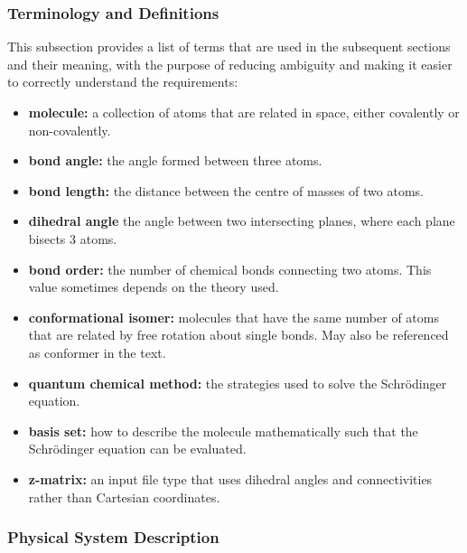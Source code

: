 \documentclass[12pt]{article}
\begin{document}
\subsubsection{Terminology and Definitions}


This subsection provides a list of terms that are used in the subsequent
sections and their meaning, with the purpose of reducing ambiguity and making it
easier to correctly understand the requirements:


\begin{itemize}
\item \textbf{molecule:} a collection of atoms that are related in space, 
either covalently or non-covalently.
\item \textbf{bond angle:} the angle formed between three atoms.
\item \textbf{bond length:} the distance between the centre of masses of two 
atoms.
\item \textbf{dihedral angle} the angle between two intersecting planes, where 
each plane bisects 3 atoms.
\item \textbf{bond order:} the number of chemical bonds connecting two atoms. 
This value sometimes depends on the theory used.
\item \textbf{conformational isomer:} molecules that have the same number of 
atoms that are related by free rotation about single bonds. May also be 
referenced as conformer in the text. 
\item \textbf{quantum chemical method:} the strategies used to solve the 
Schr\"{o}dinger equation.
\item \textbf{basis set:} how to describe the molecule mathematically such that 
the Schr\"{o}dinger equation can be evaluated.
\item \textbf{z-matrix:} an input file type that uses dihedral angles and 
connectivities rather than Cartesian coordinates.
\end{itemize}

\subsubsection{Physical System Description}
\end{document}
